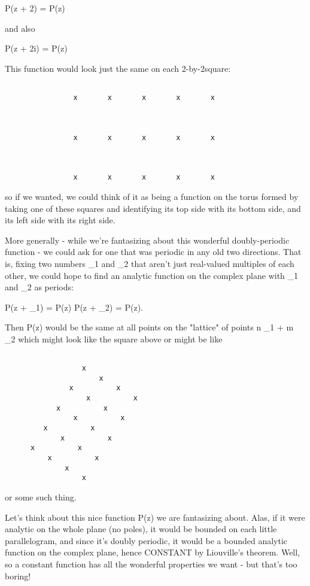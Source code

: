 			P(z + 2\pi ) = P(z)

and also 

                        P(z + 2\pi i) = P(z)

This function would look just the same on each 2\pi -by-2\pi  square:


\begin{verbatim}

                x       x       x       x       x



                x       x       x       x       x



                x       x       x       x       x
\end{verbatim}
    

so if we wanted, we could think of it as being a function on the torus
formed by taking one of these squares and identifying its top side with
its bottom side, and its left side with its right side.  

More generally - while we're fantasizing about this wonderful
doubly-periodic function - we could ask for one that was periodic in any
old two directions.  That is, fixing two numbers \omega _{1} and 
\omega _{2}
that aren't just real-valued multiples of each other, we could hope to
find an analytic function on the complex plane with \omega _{1} 
and \omega _{2} as periods:

                      P(z + \omega _{1}) = P(z)
                      P(z + \omega _{2}) = P(z).

Then P(z) would be the same at all points on the "lattice" of points
n \omega _{1} + m \omega _{2}
which might look like the square above or might be like



\begin{verbatim}

                  x
                      x
               x          x
                   x          x 
            x          x
                x          x
         x          x
             x          x
      x          x   
          x          x
              x 
                  x

\end{verbatim}
    

or some such thing.  

Let's think about this nice function P(z) we are fantasizing
about.  Alas, if it were analytic on the whole plane (no poles), it
would be bounded on each little parallelogram, and since it's doubly
periodic, it would be a bounded analytic function on the complex plane,
hence CONSTANT by Liouville's theorem.  Well, so a constant function has
all the wonderful properties we want - but that's too boring!

